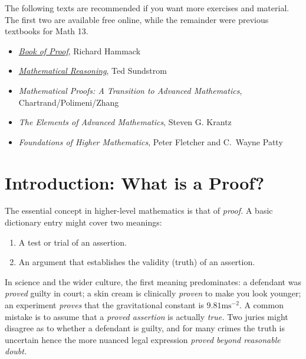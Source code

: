 
The following texts are recommended if you want more exercises and material. The first two are available free online, while the remainder were previous textbooks for Math 13.

\begin{itemize}%
	\item \href{http://www.people.vcu.edu/~rhammack/BookOfProof/}{\emph{Book of Proof}}, Richard Hammack%
	
	\item \href{http://scholarworks.gvsu.edu/books/9/}{\emph{Mathematical Reasoning}}, Ted Sundstrom%

	\item \emph{Mathematical Proofs: A Transition to Advanced Mathematics}, Chartrand/Polimeni/Zhang%
	\item \emph{The Elements of Advanced Mathematics}, Steven G. Krantz%
	\item \emph{Foundations of Higher Mathematics}, Peter Fletcher and C.~Wayne Patty%
\end{itemize}




\clearpage


\section{Introduction: What is a Proof?}


The essential concept in higher-level mathematics is that of \emph{proof.} A basic dictionary entry might cover two meanings:
\begin{enumerate}%
	\item A test or trial of an assertion.
	\item An argument that establishes the validity (truth) of an assertion.
\end{enumerate}
In science and the wider culture, the first meaning predominates: a defendant was \emph{proved} guilty in court; a skin cream is clinically \emph{proven} to make you look younger; an experiment \emph{proves} that the gravitational constant is $9.81\mathrm{ms}^{-2}$. A common mistake is to assume that a \emph{proved assertion} is actually \emph{true.} Two juries might disagree as to whether a defendant is guilty, and for many crimes the truth is uncertain hence the more nuanced legal expression \emph{proved beyond reasonable doubt.}\smallbreak

